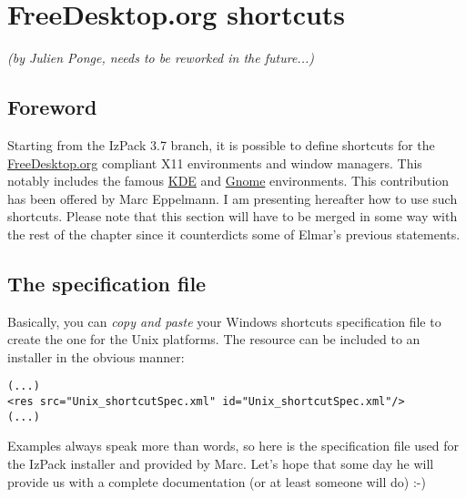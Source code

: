 \section{FreeDesktop.org shortcuts}

\textit{(by Julien Ponge, needs to be reworked in the future...)}

\subsection{Foreword}

Starting from the IzPack 3.7 branch, it is possible to define shortcuts
for the \href{http://www.freedesktop.org/}{FreeDesktop.org} compliant X11
environments and window managers. This notably includes the famous
\href{http://www.kde.org/}{KDE} and \href{http://www.gnome.org/}{Gnome}
environments. This contribution has been offered by Marc Eppelmann. I am
presenting hereafter how to use such shortcuts. Please note that this section
will have to be merged in some way with the rest of the chapter since it
counterdicts some of Elmar's previous statements.

\subsection{The specification file}

Basically, you can \textsl{copy and paste} your Windows shortcuts specification
file to create the one for the Unix platforms. The resource can be included to
an installer in the obvious manner:
\begin{verbatim}
(...)
<res src="Unix_shortcutSpec.xml" id="Unix_shortcutSpec.xml"/>
(...)

\end{verbatim}

Examples always speak more than words, so here is the specification file used
for the IzPack installer and provided by Marc. Let's hope that some day he will
provide us with a complete documentation (or at least someone will do) :-)


